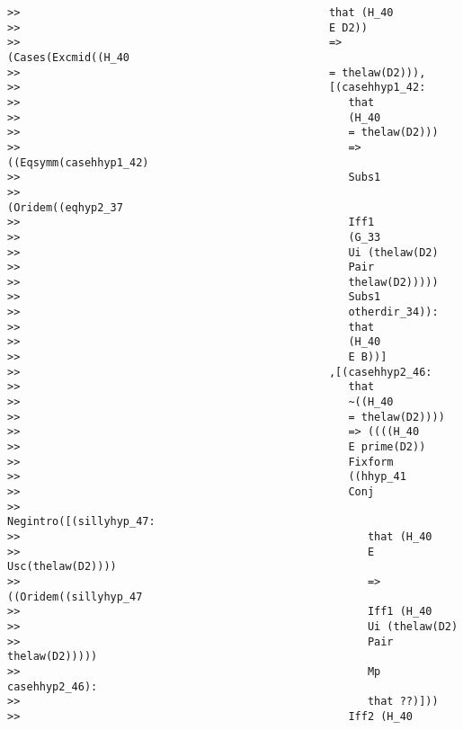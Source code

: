 \documentclass[12pt]{article}
\begin{document}
\begin{verbatim}
>>                                                that (H_40
>>                                                E D2))
>>                                                => (Cases(Excmid((H_40
>>                                                = thelaw(D2))),
>>                                                [(casehhyp1_42:
>>                                                   that
>>                                                   (H_40
>>                                                   = thelaw(D2)))
>>                                                   => ((Eqsymm(casehhyp1_42)
>>                                                   Subs1
>>                                                   (Oridem((eqhyp2_37
>>                                                   Iff1
>>                                                   (G_33
>>                                                   Ui (thelaw(D2)
>>                                                   Pair
>>                                                   thelaw(D2)))))
>>                                                   Subs1
>>                                                   otherdir_34)):
>>                                                   that
>>                                                   (H_40
>>                                                   E B))]
>>                                                ,[(casehhyp2_46:
>>                                                   that
>>                                                   ~((H_40
>>                                                   = thelaw(D2))))
>>                                                   => ((((H_40
>>                                                   E prime(D2))
>>                                                   Fixform
>>                                                   ((hhyp_41
>>                                                   Conj
>>                                                   Negintro([(sillyhyp_47:
>>                                                      that (H_40
>>                                                      E Usc(thelaw(D2))))
>>                                                      => ((Oridem((sillyhyp_47
>>                                                      Iff1 (H_40
>>                                                      Ui (thelaw(D2)
>>                                                      Pair thelaw(D2)))))
>>                                                      Mp casehhyp2_46):
>>                                                      that ??)]))
>>                                                   Iff2 (H_40

\end{verbatim}
\end{document}
